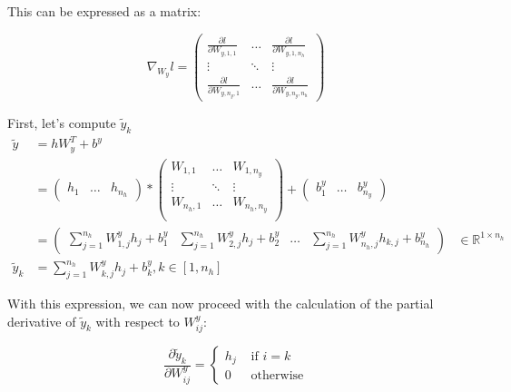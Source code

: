 \documentclass{article}
\theoremstyle{plain}%
\theoremstyle{definition}
\theoremstyle{remark}
\begin{document}
This can be expressed as a matrix:

\[
    \nabla_{W_y} l = \begin{pmatrix}
        \frac{\partial l}{\partial W_{y, 1,1}}   & \dots  & \frac{\partial l}{\partial W_{y, 1,n_h}}    \\
        \vdots                                   & \ddots & \vdots                                      \\
        \frac{\partial l}{\partial W_{y, n_y,1}} & \dots  & \frac{\partial l}{\partial W_{y, n_y, n_h}}
    \end{pmatrix}
\]

First, let's compute $ \tilde{y}_k $
\begin{align*}
    \tilde{y}   & = h W_y^T + b^y                                                                                                        \\
                & = \begin{pmatrix}
        h_{1} & \dots & h_{n_h}
    \end{pmatrix} * \begin{pmatrix}
        W_{1, 1}   & \dots  & W_{1, n_y}   \\
        \vdots     & \ddots & \vdots       \\
        W_{n_h, 1} & \dots  & W_{n_h, n_y} \\
    \end{pmatrix} + \begin{pmatrix}
        b^y_1 & \dots & b^y_{n_y}
    \end{pmatrix}                                 \\
                & = \begin{pmatrix}
        \sum_{j=1}^{n_h} W^y_{1,j} h_{j} + b^y_1 & \sum_{j=1}^{n_h} W^y_{2,j} h_{j} + b^y_2 & \dots & \sum_{j=1}^{n_h} W^y_{n_h,j} h_{k,j} + b^y_{n_h}
    \end{pmatrix}                                                           & \in \mathbb{R}^{1 \times n_h} \\
    \tilde{y}_k & = \sum_{j=1}^{n_h} W^y_{k,j} h_{j} + b_k^y, k \in [1, n_h]
\end{align*}

With this expression, we can now proceed with the calculation of the partial derivative of \( \tilde{y}_k \) with respect to \( W^y_{ij} \):

\[
    \frac{\partial \tilde{y}_k }{\partial W^y_{ij}} = \begin{cases}
        h_j & \text{ if } i=k   \\
        0   & \text{ otherwise}
    \end{cases}
\]
\end{document}
